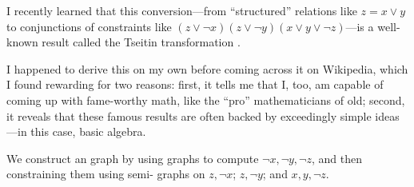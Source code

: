 \begin{aside}
  I recently learned that this conversion—from ``structured'' relations like
  \(z=x∨y\) to conjunctions of constraints like \((z∨¬x)(z∨¬y)(x∨y∨¬z)\)—is a
  well-known result called the Tseitin transformation \parencite{tseitin}.

  I happened to derive this on my own before coming across it on Wikipedia,
  which I found rewarding for two reasons: first, it tells me that I, too, am
  capable of coming up with fame-worthy math, like the ``pro'' mathematicians of
  old; second, it reveals that these famous results are often backed by
  exceedingly simple ideas—in this case, basic algebra.

\end{aside}

We construct an \OR{} graph by using \NOT{} graphs to compute \(¬x,¬y,¬z\), and
then constraining them using semi-\OR{} graphs on \(z,¬x\); \(z,¬y\); and
\(x,y,¬z\).


